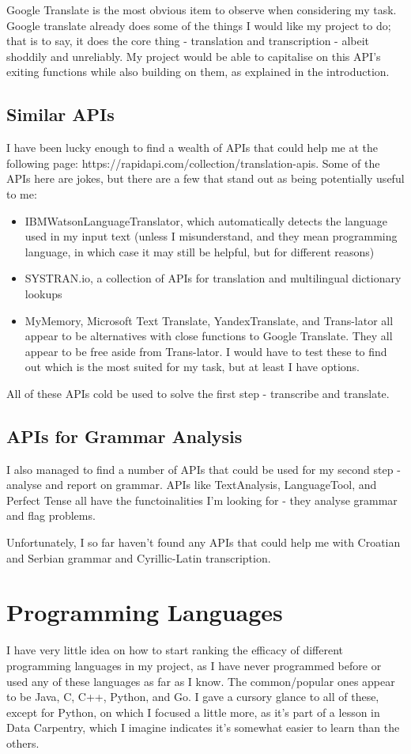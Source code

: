 \documentclass{article}
\begin{document}
Google Translate is the most obvious item to observe when considering my task. Google translate already does some of the things I would like my project to do; that is to say, it does the core thing - translation and transcription - albeit shoddily and unreliably. My project would be able to capitalise on this API's exiting functions while also building on them, as explained in the introduction.

\subsection{Similar APIs}
I have been lucky enough to find a wealth of APIs that could help me at the following page: https://rapidapi.com/collection/translation-apis. Some of the APIs here are jokes, but there are a few that stand out as being potentially useful to me:
\begin{itemize}
\item IBMWatsonLanguageTranslator, which automatically detects the language used in my input text (unless I misunderstand, and they mean programming language, in which case it may still be helpful, but for different reasons)
\item SYSTRAN.io, a collection of APIs for translation and multilingual dictionary lookups
\item MyMemory, Microsoft Text Translate, YandexTranslate, and Trans-lator all appear to be alternatives with close functions to Google Translate. They all appear to be free aside from Trans-lator. I would have to test these to find out which is the most suited for my task, but at least I have options.
\end{itemize}

All of these APIs cold be used to solve the first step - transcribe and translate.

\subsection{APIs for Grammar Analysis}
I also managed to find a number of APIs that could be used for my second step - analyse and report on grammar. APIs like TextAnalysis, LanguageTool, and Perfect Tense all have the functoinalities I'm looking for - they analyse grammar and flag problems.

Unfortunately, I so far haven't found any APIs that could help me with Croatian and Serbian grammar and Cyrillic-Latin transcription.


\section{Programming Languages}
I have very little idea on how to start ranking the efficacy of different programming languages in my project, as I have never programmed before or used any of these languages as far as I know. The common/popular ones appear to be Java, C, C++, Python, and Go. I gave a cursory glance to all of these, except for Python, on which I focused a little more, as it's part of a lesson in Data Carpentry, which I imagine indicates it's somewhat easier to learn than the others.
\end{document}
